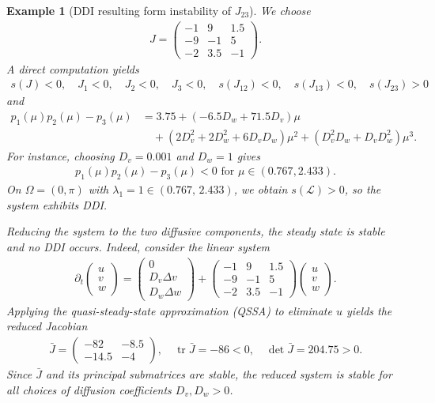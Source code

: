 \documentclass[12pt, a4paper]{amsart}
\numberwithin{equation}{section}
\newcommand{\un}{u}
\newcommand{\us}{v}
\newcommand{\uf}{w}
\newcommand{\Ds}{D_v}
\newcommand{\Df}{D_w}
\renewcommand{\L}{{\mathcal{L}}}
\DeclareMathOperator{\tr}{tr}
\newtheorem{example}[theorem]{\bf Example}
\begin{document}
\begin{example}[DDI resulting form instability of $J_{23}$]\label{ex:DDI_from_PDE_subsystem}
    We choose
    \begin{align*}
        J = \begin{pmatrix}-1&9&1.5\\-9&-1&5\\-2&3.5&-1\end{pmatrix}.
    \end{align*}
    A direct computation yields
    \begin{align*}
        s(J) < 0, \quad J_1<0, \quad J_2<0, \quad J_3 < 0, \quad s(J_{12})<0, \quad s(J_{13})<0, \quad s(J_{23}) > 0
    \end{align*}
    and
    \begin{align*}
        p_1(\mu)p_2(\mu) - p_3(\mu) &= 3.75 + (-6.5 \Df + 71.5 \Ds) \mu\\
        &\quad+ (2\Ds^2 + 2\Df^2 + 6\Ds\Df) \mu^2 + (\Ds^2\Df + \Ds\Df^2) \mu^3.
    \end{align*}
    For instance, choosing $\Ds = 0.001$ and $\Df = 1$ gives
    \begin{align*}
        p_1(\mu)p_2(\mu) - p_3(\mu) < 0 \text{ for } \mu \in (0.767, 2.433).
    \end{align*}
    On $\Omega = (0,\pi)$ with $\lambda_1 = 1 \in (0.767,\, 2.433)$, we obtain $s(\L) > 0$, so the system exhibits DDI.

    
    Reducing the system to the two diffusive components, the steady state is stable and no DDI occurs.
    Indeed, consider the linear system
    \begin{align*}
        \partial_t \begin{pmatrix}\un\\\us\\\uf\end{pmatrix} = \begin{pmatrix}0\\\Ds \Delta \us\\\Df\Delta \uf\end{pmatrix} + \begin{pmatrix}-1&9&1.5\\-9&-1&5\\-2&3.5&-1\end{pmatrix} \begin{pmatrix}\un\\\us\\\uf\end{pmatrix}.
    \end{align*}
    Applying the quasi-steady-state approximation (QSSA) to eliminate $\un$ yields the reduced Jacobian
    \begin{align*}
        \bar{J} = \begin{pmatrix}-82&-8.5\\-14.5&-4\end{pmatrix}, \quad \tr\bar{J} = -86 < 0, \quad \det\bar{J} = 204.75 > 0.
    \end{align*}
Since $\bar{J}$ and its principal submatrices are stable, the reduced system is stable for all choices of diffusion coefficients $\Ds, \Df > 0$.
\end{example}
\end{document}
